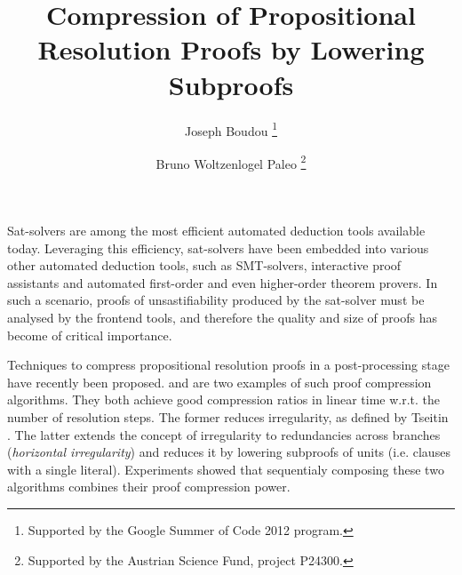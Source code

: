 \documentclass{easychair}
\title{Compression of Propositional Resolution Proofs by Lowering Subproofs}
\author{
  Joseph Boudou\inst{1}
  \thanks{Supported by the Google Summer of Code 2012 program.}
  \and 
  Bruno Woltzenlogel Paleo\inst{2}
  \thanks{Supported by the Austrian Science Fund, project P24300.}
}
\institute{
  Universit\'e Paul Sabatier, Toulouse \\
  \email{joseph.boudou@matabio.net}
  \and 
  Vienna University of Technology \\
  \email{bruno@logic.at}
}
\begin{document}
\maketitle

Sat-solvers are among the most efficient automated deduction tools available today.
Leveraging this efficiency, sat-solvers have been embedded
into various other automated deduction tools,
such as SMT-solvers, interactive proof assistants and automated first-order
and even higher-order theorem provers.
In such a scenario, proofs of unsastifiability produced by the sat-solver must be analysed by the frontend tools, and therefore the quality and
size of proofs has become of critical importance.



Techniques to compress propositional resolution proofs in a post-processing stage have recently been
proposed.
\RecyclePivotsIntersection and \LowerUnits \cite{LURPI} are two examples of such proof
compression algorithms. They both achieve good compression ratios in linear time w.r.t. the number of
resolution steps. The former reduces irregularity, as defined by Tseitin \cite{Tseitin}. The
latter extends the concept of irregularity to redundancies across branches (\emph{horizontal irregularity}) and reduces it
 by lowering subproofs of units (i.e. clauses with a single literal).
Experiments showed \cite{LURPI} that sequentialy composing these two algorithms combines their proof compression power.
\end{document}
